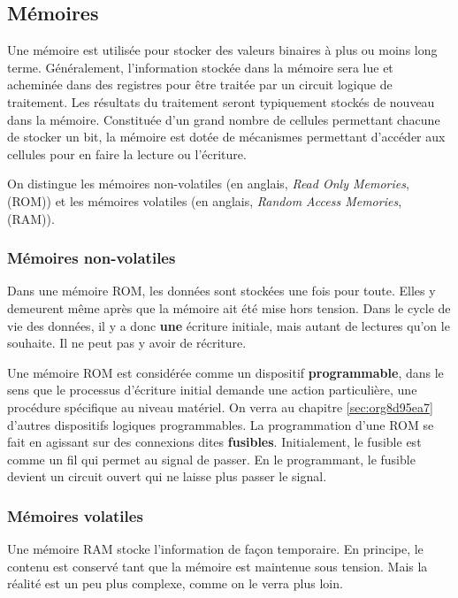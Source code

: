 \documentclass[11pt]{article}
\begin{document}
\subsection{Mémoires}
\label{sec:org7a646c5}

Une mémoire est utilisée pour stocker des valeurs binaires à plus ou
moins long terme. Généralement, l'information stockée dans la mémoire
sera lue et acheminée dans des registres pour être traitée par un
circuit logique de traitement. Les résultats du traitement seront
typiquement stockés de nouveau dans la mémoire. Constituée d'un grand
nombre de cellules permettant chacune de stocker un bit, la mémoire
est dotée de mécanismes permettant d'accéder aux cellules pour en
faire la lecture ou l'écriture.

On distingue les mémoires non-volatiles (en anglais, \emph{Read Only
Memories}, (ROM)) et les mémoires volatiles (en anglais, \emph{Random Access
Memories}, (RAM)).

\subsubsection{Mémoires non-volatiles}
\label{sec:org23be1b6}

Dans une mémoire ROM, les données sont stockées une fois pour
toute. Elles y demeurent même après que la mémoire ait été mise hors
tension. Dans le cycle de vie des données, il y a donc \textbf{une} écriture
initiale, mais autant de lectures qu'on le souhaite. Il ne peut pas y
avoir de récriture.

Une mémoire ROM est considérée comme un dispositif \textbf{programmable},
dans le sens que le processus d'écriture initial demande une action
particulière, une procédure spécifique au niveau matériel. On verra au
chapitre \ref{sec:org8d95ea7} d'autres dispositifs logiques
programmables. La programmation d'une ROM se fait en agissant sur des
connexions dites \textbf{fusibles}. Initialement, le fusible est comme un fil
qui permet au signal de passer. En le programmant, le fusible devient
un circuit ouvert qui ne laisse plus passer le signal.

\subsubsection{Mémoires volatiles}
\label{sec:org0b81ac6}

Une mémoire RAM stocke l'information de façon temporaire. En principe,
le contenu est conservé tant que la mémoire est maintenue sous
tension. Mais la réalité est un peu plus complexe, comme on le verra
plus loin.
\end{document}
